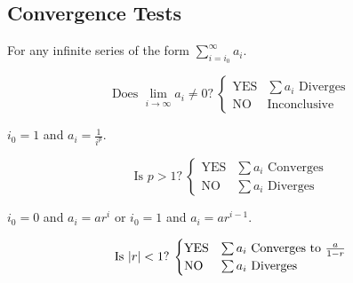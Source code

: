\documentclass{article}
\theoremstyle{plain}
\numberwithin{theorem}{subsection}
\theoremstyle{definition}
\numberwithin{definition}{subsection}
\theoremstyle{remark}
\numberwithin{note}{subsection}
\begin{document}
\subsection{Convergence Tests}
For any infinite series of the form $\displaystyle\sum_{i=i_0}^\infty a_i$.
\begin{multicols}{2}
	\begin{mdframed}[style=exampledefaultcols,frametitle={Divergence Test}]
		\begin{equation*}
			\text{Does $\lim_{i\to\infty}a_i\neq0$?}\:
			\begin{cases}
				\text{YES} & \text{$\sum a_i$ Diverges} \\
				\text{NO} & \text{Inconclusive}
			\end{cases}
		\end{equation*}
	\end{mdframed}
	\begin{mdframed}[style=exampledefaultcols,frametitle={$p$-Series}]
		\begin{description}[style=sameline]
			\item[Form] $i_0=1$ and $a_i = \frac{1}{i^p}$.
		\end{description}
		\begin{equation*}
			\text{Is $p>1$?}\:
			\begin{cases}
				\text{YES} & \text{$\sum a_i$ Converges} \\
				\text{NO} & \text{$\sum a_i$ Diverges}
			\end{cases}
		\end{equation*}
	\end{mdframed}
	\begin{mdframed}[style=exampledefaultcols,frametitle={Geometric Series}]
		\begin{description}[style=sameline]
			\item[Form] $i_0=0$ and $a_i = a r^i$ or $i_0=1$ and $a_i = a r^{i-1}$.
		\end{description}
		\begin{equation*}
			\text{Is $\abs{r}<1$?}\:
			\begin{cases}
				\text{YES} & \text{$\sum a_i$ Converges to $\frac{a}{1-r}$} \\
				\text{NO} & \text{$\sum a_i$ Diverges}

\end{cases}
\end{equation*}
\end{mdframed}
\end{multicols}
\end{document}
